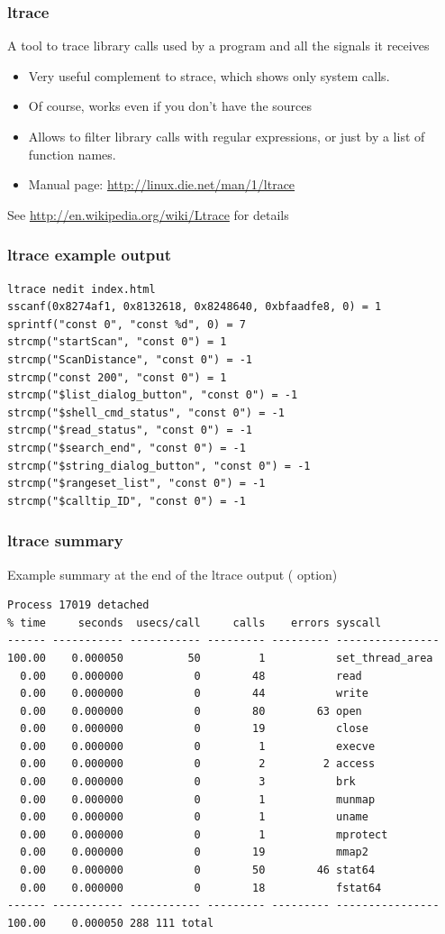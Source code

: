 \begin{frame}
  \frametitle{ltrace}
  A tool to trace library calls used by a program and all the signals
  it receives
  \begin{itemize}
  \item Very useful complement to strace, which shows only system
    calls.
  \item Of course, works even if you don't have the sources
  \item Allows to filter library calls with regular expressions, or
    just by a list of function names.
  \item Manual page: \url{http://linux.die.net/man/1/ltrace}
  \end{itemize}
  See \url{http://en.wikipedia.org/wiki/Ltrace} for details
\end{frame}

\begin{frame}[fragile]
  \frametitle{ltrace example output}
  \small
  \begin{block}{}
\begin{verbatim}
ltrace nedit index.html
sscanf(0x8274af1, 0x8132618, 0x8248640, 0xbfaadfe8, 0) = 1
sprintf("const 0", "const %d", 0) = 7
strcmp("startScan", "const 0") = 1
strcmp("ScanDistance", "const 0") = -1
strcmp("const 200", "const 0") = 1
strcmp("$list_dialog_button", "const 0") = -1
strcmp("$shell_cmd_status", "const 0") = -1
strcmp("$read_status", "const 0") = -1
strcmp("$search_end", "const 0") = -1
strcmp("$string_dialog_button", "const 0") = -1
strcmp("$rangeset_list", "const 0") = -1
strcmp("$calltip_ID", "const 0") = -1
\end{verbatim}
\end{block}
\end{frame}

\begin{frame}[fragile]
  \frametitle{ltrace summary}
  Example summary at the end of the ltrace output ( option)
  \scriptsize
  \begin{block}{}
\begin{verbatim}
Process 17019 detached
% time     seconds  usecs/call     calls    errors syscall
------ ----------- ----------- --------- --------- ----------------
100.00    0.000050          50         1           set_thread_area
  0.00    0.000000           0        48           read
  0.00    0.000000           0        44           write
  0.00    0.000000           0        80        63 open
  0.00    0.000000           0        19           close
  0.00    0.000000           0         1           execve
  0.00    0.000000           0         2         2 access
  0.00    0.000000           0         3           brk
  0.00    0.000000           0         1           munmap
  0.00    0.000000           0         1           uname
  0.00    0.000000           0         1           mprotect
  0.00    0.000000           0        19           mmap2
  0.00    0.000000           0        50        46 stat64
  0.00    0.000000           0        18           fstat64
------ ----------- ----------- --------- --------- ----------------
100.00    0.000050 288 111 total
\end{verbatim}
  \end{block}
\end{frame}

